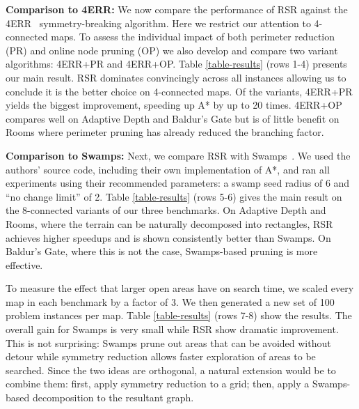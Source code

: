 \textbf{Comparison to 4ERR: }
We now compare the performance of RSR against the 4ERR~\cite{harabor10} symmetry-breaking
algorithm. Here we restrict our attention to 4-connected maps.  To
assess the individual impact of both perimeter reduction (PR) and online node
pruning (OP) we also develop and compare two variant algorithms: 4ERR+PR and
4ERR+OP. 
Table \ref{table-results} (rows 1-4) presents our main result. RSR dominates
convincingly across all instances allowing us to conclude it is the better
choice on 4-connected maps. 
Of the variants, 4ERR+PR yields the biggest improvement, speeding up A* by up to 20 times.
4ERR+OP compares well on Adaptive Depth and Baldur's Gate but is of little benefit on 
Rooms where perimeter pruning has already reduced the branching factor.
\par
\textbf{Comparison to Swamps:}
Next, we compare RSR with Swamps~\cite{pochter10}.  
We used the authors' source code, including their own implementation of A*, and 
ran all experiments using their recommended parameters: a swamp seed radius of 6 
and ``no change limit'' of 2. Table \ref{table-results} (rows 5-6) gives the main
result on the 8-connected variants of our three benchmarks.
On Adaptive Depth and Rooms, where the terrain can be naturally decomposed into
rectangles, RSR achieves higher speedups and is shown consistently better than Swamps. 
On Baldur's Gate, where this is not the case, Swamps-based pruning is more
effective. 
\par
To measure the effect that larger open areas have on search time, we scaled
every map in each benchmark by a factor of 3. We then generated a new set of 100
problem instances per map. Table \ref{table-results} (rows 7-8) show the results.  
The overall gain for Swamps is very small while RSR show dramatic improvement.
This is not surprising: Swamps prune out
areas that can be avoided without detour while symmetry reduction allows
faster exploration of areas to be searched.
Since the two ideas are orthogonal, a natural extension would be to combine them: 
first, apply symmetry reduction to a grid; then, apply a Swamps-based 
decomposition to the resultant graph.




